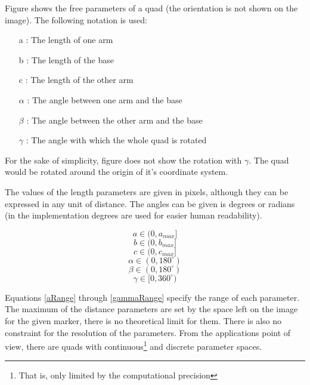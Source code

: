 Figure  shows the free parameters of a quad (the orientation is not shown on the image).
The following notation is used:
\begin{itemize}
	\item[a]: The length of one arm
	\item[b]: The length of the base
	\item[c]: The length of the other arm
	\item[$\alpha$]: The angle between one arm and the base
	\item[$\beta$]: The angle between the other arm and the base
	\item[$\gamma$]: The angle with which the whole quad is rotated
\end{itemize}
For the sake of simplicity, figure  does not show the rotation with $\gamma$.
The quad would be rotated around the origin of it's coordinate system.

The values of the length parameters are given in pixels, although they can be expressed in any unit of distance.
The angles can be given is degrees or radians (in the implementation degrees are used for easier human readability).

\begin{equation}
	a\in(0 , a_{max}]
	\label{eq:aRange}
\end{equation}
\begin{equation}
	b\in(0 , b_{max}]
	\label{eq:bRange}
\end{equation}
\begin{equation}
	c\in(0 , c_{max}]
	\label{eq:cRange}
\end{equation}
\begin{equation}
	\alpha\in(0 , 180^\circ)
	\label{eq:alphaRange}
\end{equation}
\begin{equation}
	\beta\in(0 , 180^\circ)
	\label{eq:betaRange}
\end{equation}
\begin{equation}
	\gamma\in[0 , 360^\circ)
	\label{eq:gammaRange}
\end{equation}

Equations \eqref{aRange} through \eqref{gammaRange} specify the range of each parameter.
The maximum of the distance parameters are set by the space left on the image for the given marker, there is no theoretical limit for them.
There is also no constraint for the resolution of the parameters.
From the applications point of view, there are quads with continuous\footnote{That is, only limited by the computational precision} and discrete parameter spaces.

